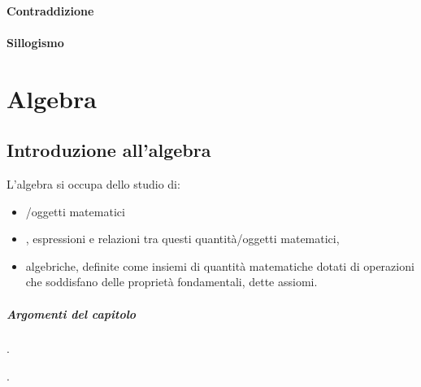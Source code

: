 \documentclass[letterpaper,10pt,italian]{jupyterBook}
\begin{document}
\subsection{Contraddizione}
\label{\detokenize{ch/logics:contraddizione}}\label{\detokenize{ch/logics:logics-contradiction}}

\subsection{Sillogismo}
\label{\detokenize{ch/logics:sillogismo}}\label{\detokenize{ch/logics:logics-syllogism}}
\sphinxstepscope


\part{Algebra}

\sphinxstepscope




\chapter{Introduzione all’algebra}
\label{\detokenize{ch/algebra:introduzione-all-algebra}}\label{\detokenize{ch/algebra:math-hs-algebra}}\label{\detokenize{ch/algebra::doc}}
\sphinxAtStartPar
L’algebra si occupa dello studio di:
\begin{itemize}
\item {} 
\sphinxAtStartPar
{}/oggetti matematici

\item {} 
\sphinxAtStartPar
{}, espressioni e relazioni tra questi quantità/oggetti matematici,

\item {} 
\sphinxAtStartPar
{} algebriche, definite come insiemi di quantità matematiche dotati di operazioni che soddisfano delle proprietà fondamentali, dette assiomi.

\end{itemize}
\subsubsection*{Argomenti del capitolo}

\sphinxAtStartPar
{\hyperref[\detokenize{ch/algebra/real-algebra:math-hs-algebra-real}]{}}.

\sphinxAtStartPar
{\hyperref[\detokenize{ch/algebra/real-n-algebra:math-hs-algebra-real-n}]{}}.
\end{document}

